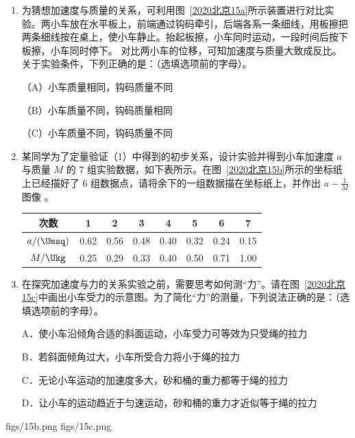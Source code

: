 \documentclass[\gkver]{gaokaozhenti}
\begin{document}
\begin{enumerate}
\begin{enumerate}
	\item
	为猜想加速度与质量的关系，可利用图~\ref{2020北京15a}所示装置进行对比实验。两小车放在水平板上，前端通过钩码牵引，后端各系一条细线，用板擦把两条细线按在桌上，使小车静止。抬起板擦，小车同时运动，一段时间后按下板擦，小车同时停下。	对比两小车的位移，可知加速度与质量大致成反比。关于实验条件，下列正确的是：（选填选项前的字母）。
	
	（A）小车质量相同，钩码质量不同
	
	（B）小车质量不同，钩码质量相同
	
	（C）小车质量不同，钩码质量不同
	\item
	某同学为了定量验证（1）中得到的初步关系，设计实验并得到小车加速度 $a$ 与质量 $M$ 的 7 组实验数据，如下表所示。在图~\ref{2020北京15b}所示的坐标纸上已经描好了 6 组数据点，请将余下的一组数据描在坐标纸上，并作出 $a-\frac{1}{M}$ 图像 。
	
	\begin{center}
	\begin{tabular}{|c|c|c|c|c|c|c|c|}
	\hline
	次数 & 1 & 2 & 3 & 4 & 5 & 6 & 7 \\
	\hline
	$a/(\Umsq)$ & 0.62 & 0.56 & 0.48 & 0.40 & 0.32 & 0.24 & 0.15 \\
	\hline
	$M/\Ukg$ & 0.25 & 0.29 & 0.33 & 0.40 & 0.50 & 0.71 & 1.00 \\
	\hline
	\end{tabular}
	\end{center}
	\item
	在探究加速度与力的关系实验之前，需要思考如何测“力”。请在图~\ref{2020北京15c}中画出小车受力的示意图。为了简化“力”的测量，下列说法正确的是：（选填选项前的字母）。
	
	A．使小车沿倾角合适的斜面运动，小车受力可等效为只受绳的拉力
	
	B．若斜面倾角过大，小车所受合力将小于绳的拉力
	
	C．无论小车运动的加速度多大，砂和桶的重力都等于绳的拉力
	
	D．让小车的运动趋近于匀速运动，砂和桶的重力才近似等于绳的拉力
\end{enumerate}

{figs/15b.png}
{figs/15c.png}

\end{enumerate}
\end{document}
